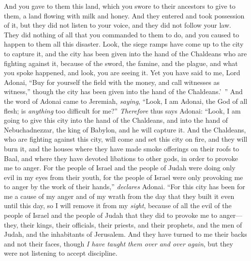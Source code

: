 \begin{biblechapter}
\verse And you gave to them this land, which you swore to their ancestors to give to them, a land flowing with milk and honey.
\verse And they entered and took possession of it, but they did not listen to your voice, and they did not follow your law. They did nothing of all that you commanded to them to do, and you caused to happen to them all this disaster.
\verse Look, the siege ramps have come up to the city to capture it, and the city has been given into the hand of the Chaldeans who are fighting against it, because of the sword, the famine, and the plague, and what you spoke happened, and look, you are seeing it.
\verse Yet you have said to me, Lord Adonai, “Buy for yourself the field with the money, and call witnesses as witness,” though the city has been given into the hand of the Chaldeans.’ ”
\verse And the word of Adonai came to Jeremiah, \textit{saying},
\verse “Look, I am Adonai, the God of all flesh; is \textit{anything} too difficult for me?”
\verse \textit{Therefore} thus says Adonai: “Look, I am going to give this city into the hand of the Chaldeans, and into the hand of Nebuchadnezzar, the king of Babylon, and he will capture it.
\verse And the Chaldeans, who are fighting against this city, will come and set this city on fire, and they will burn it, and the houses where they have made smoke offerings on their roofs to Baal, and where they have devoted libations to other gods, in order to provoke me to anger.
\verse For the people of Israel and the people of Judah were doing only evil in my eyes from their youth, for the people of Israel were only provoking me to anger by the work of their hands,” \textit{declares} Adonai.
\verse “For this city has been for me a cause of my anger and of my wrath from the day that they built it even until this day, so I will remove it from my \textit{sight},
\verse because of all the evil of the people of Israel and the people of Judah that they did to provoke me to anger—they, their kings, their officials, their priests, and their prophets, and the men of Judah, and the inhabitants of Jerusalem.
\verse And they have turned to me their backs and not their faces, though \textit{I have taught them over and over again}, but they were not listening to accept discipline.

\end{biblechapter}
